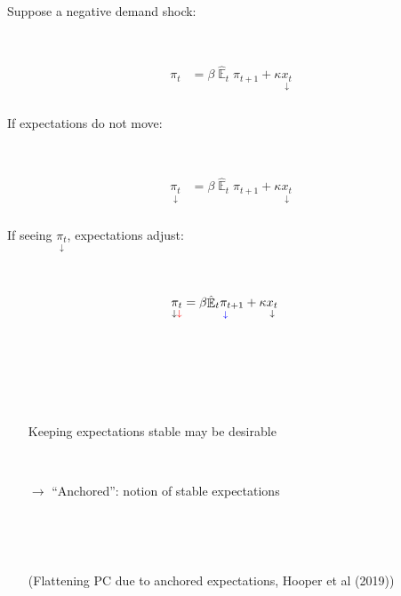 \documentclass{beamer}
\DeclareMathOperator{\E}{\mathbb{E}}
\begin{document}
\begin{frame}
	\frametitle{}

Suppose a negative demand shock:

\

\begin{align*}
\pi_t & = \beta \hat{\E}_t\pi_{t+1} + \kappa \underset{\downarrow}{x_t} 
\end{align*}




\end{frame}

\begin{frame}
	\frametitle{}

If expectations do not move:

\

\begin{align*}
\underset{\downarrow}{\pi_t} & = \beta \hat{\E}_t\pi_{t+1}+ \kappa \underset{\downarrow}{x_t} 
\end{align*}




\end{frame}

\begin{frame}
	\frametitle{}

If seeing $\underset{\downarrow}{\pi_t}$, expectations adjust:

\

\begin{align*}
\underset{\downarrow \color{red}{\downarrow}}{\pi_t} & = \beta \underset{\color{blue}{\downarrow}}{\hat{\E}_t\pi_{t+1}}+ \kappa \underset{\downarrow}{x_t} 
\end{align*}

\

\

\

\begin{itemize}
\item[] Keeping expectations stable may be desirable

\

\item[$\rightarrow$]  ``Anchored'': notion of stable expectations

\


\

\item[] \small{(Flattening PC due to anchored expectations, Hooper et al (2019))}
\end{itemize}

\


\end{frame}
\end{document}
